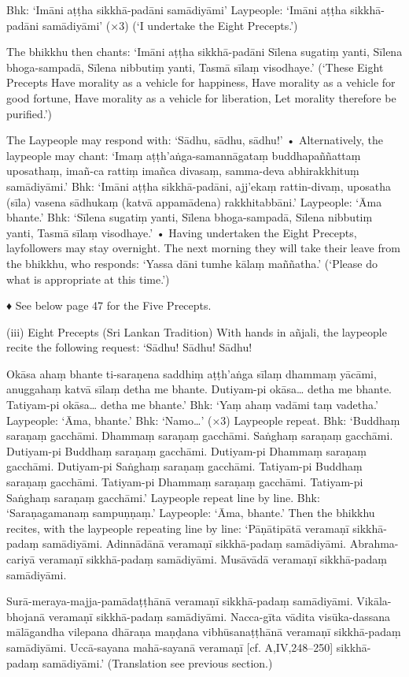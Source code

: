 Bhk: ‘Imāni aṭṭha sikkhā-padāni samādiyāmi’
Laypeople:
‘Imāni aṭṭha sikkhā-padāni samādiyāmi’ (×3)
(‘I undertake the Eight Precepts.’)

The bhikkhu then chants:
‘Imāni aṭṭha sikkhā-padāni
Sīlena sugatiṃ yanti,
Sīlena bhoga-sampadā,
Sīlena nibbutiṃ yanti,
Tasmā sīlaṃ visodhaye.’
(‘These Eight Precepts
Have morality as a vehicle for happiness,
Have morality as a vehicle for good fortune,
Have morality as a vehicle for liberation,
Let morality therefore be purified.’)

The Laypeople may respond with:
‘Sādhu, sādhu, sādhu!’
• Alternatively, the laypeople may chant:
‘Imaṃ aṭṭh'aṅga-samannāgataṃ buddhapaññattaṃ uposathaṃ, imañ-ca rattiṃ imañca divasaṃ, samma-deva abhirakkhituṃ
samādiyāmi.’
Bhk:
‘Imāni aṭṭha sikkhā-padāni,
ajj'ekaṃ rattin-divaṃ,
uposatha (sīla) vasena sādhukaṃ (katvā
appamādena) rakkhitabbāni.’
Laypeople:
‘Āma bhante.’
Bhk:
‘Sīlena sugatiṃ yanti,
Sīlena bhoga-sampadā,
Sīlena nibbutiṃ yanti,
Tasmā sīlaṃ visodhaye.’
• Having undertaken the Eight Precepts, layfollowers may stay overnight. The next morning they will take their leave from the bhikkhu,
who responds:
‘Yassa dāni tumhe kālaṃ maññatha.’
(‘Please do what is appropriate at this time.’)

♦ See below page 47 for the Five Precepts.

(iii) Eight Precepts (Sri Lankan Tradition)
With hands in añjali, the laypeople recite the
following request:
‘Sādhu! Sādhu! Sādhu!

Okāsa ahaṃ bhante ti-saraṇena saddhiṃ
aṭṭh'aṅga sīlaṃ dhammaṃ yācāmi,
anuggahaṃ katvā sīlaṃ detha me bhante.
Dutiyam-pi okāsa… detha me bhante.
Tatiyam-pi okāsa… detha me bhante.’
Bhk:
‘Yaṃ ahaṃ vadāmi taṃ vadetha.’
Laypeople: ‘Āma, bhante.’
Bhk:
‘Namo…’ (×3)
Laypeople repeat.
Bhk: ‘Buddhaṃ saraṇaṃ gacchāmi.
Dhammaṃ saraṇaṃ gacchāmi.
Saṅghaṃ saraṇaṃ gacchāmi.
Dutiyam-pi Buddhaṃ saraṇaṃ gacchāmi.
Dutiyam-pi Dhammaṃ saraṇaṃ gacchāmi.
Dutiyam-pi Saṅghaṃ saraṇaṃ gacchāmi.
Tatiyam-pi Buddhaṃ saraṇaṃ gacchāmi.
Tatiyam-pi Dhammaṃ saraṇaṃ gacchāmi.
Tatiyam-pi Saṅghaṃ saraṇaṃ gacchāmi.’
Laypeople repeat line by line.
Bhk:
‘Saraṇagamanaṃ sampuṇṇaṃ.’
Laypeople: ‘Āma, bhante.’
Then the bhikkhu recites, with the laypeople
repeating line by line:
‘Pāṇātipātā veramaṇī sikkhā-padaṃ samādiyāmi.
Adinnādānā veramaṇī sikkhā-padaṃ samādiyāmi.
Abrahma-cariyā veramaṇī sikkhā-padaṃ
samādiyāmi.
Musāvādā veramaṇī sikkhā-padaṃ samādiyāmi.

Surā-meraya-majja-pamādaṭṭhānā veramaṇī
sikkhā-padaṃ samādiyāmi.
Vikāla-bhojanā veramaṇī sikkhā-padaṃ
samādiyāmi.
Nacca-gīta vādita visūka-dassana mālāgandha vilepana dhāraṇa maṇḍana
vibhūsanaṭṭhānā veramaṇī sikkhā-padaṃ
samādiyāmi.
Uccā-sayana mahā-sayanā veramaṇī
[cf. A,IV,248–250]
sikkhā-padaṃ samādiyāmi.’
(Translation see previous section.)

